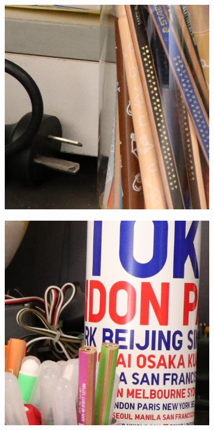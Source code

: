 \begin{figure}
\begin{subfigure}[t]{0.19\textwidth}
    \end{subfigure}
    \hfill
    \begin{subfigure}[t]{0.19\textwidth}
        \centering
        \includegraphics[width=1\textwidth]{images/guided/Canon_80D_ISO3200_IMG_8701_part8.JPG}
    \end{subfigure}
    \hfill
    \begin{subfigure}[t]{0.19\textwidth}
        \centering
        \includegraphics[width=1\textwidth]{images/guided/Canon_80D_ISO3200_IMG_8793_part10.JPG}

\end{subfigure}
\end{figure}
